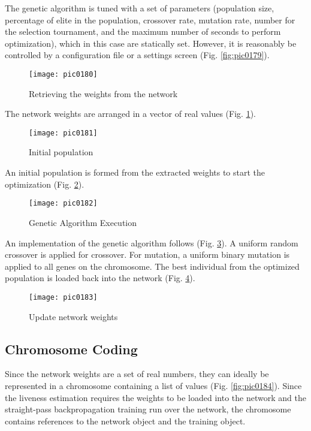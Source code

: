 The genetic algorithm is tuned with a set of parameters (population size, percentage of elite in the population, crossover rate, mutation rate, number for the selection tournament, and the maximum number of seconds to perform optimization), which in this case are statically set. However, it is reasonably be controlled by a configuration file or a settings screen (Fig. \ref{fig:pic0179}).

\begin{figure}[h]
\centering
\texttt{[image: pic0180]}
\caption{Retrieving the weights from the network}
\label{fig:pic0180}
\end{figure}
\FloatBarrier

The network weights are arranged in a vector of real values (Fig. \ref{fig:pic0180}).

\begin{figure}[h]
\centering
\texttt{[image: pic0181]}
\caption{Initial population}
\label{fig:pic0181}
\end{figure}
\FloatBarrier

An initial population is formed from the extracted weights to start the optimization (Fig. \ref{fig:pic0181}).

\begin{figure}[h]
\centering
\texttt{[image: pic0182]}
\caption{Genetic Algorithm Execution}
\label{fig:pic0182}
\end{figure}
\FloatBarrier

An implementation of the genetic algorithm follows (Fig. \ref{fig:pic0182}). A uniform random crossover is applied for crossover. For mutation, a uniform binary mutation is applied to all genes on the chromosome. The best individual from the optimized population is loaded back into the network (Fig. \ref{fig:pic0183}).

\begin{figure}[h]
\centering
\texttt{[image: pic0183]}
\caption{Update network weights}
\label{fig:pic0183}
\end{figure}
\FloatBarrier

\subsection{Chromosome Coding}

Since the network weights are a set of real numbers, they can ideally be represented in a chromosome containing a list of values (Fig. \ref{fig:pic0184}). Since the liveness estimation requires the weights to be loaded into the network and the straight-pass backpropagation training run over the network, the chromosome contains references to the network object and the training object.

